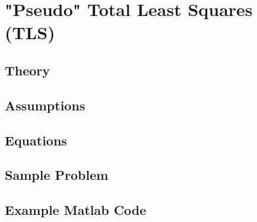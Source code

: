 \section{"Pseudo" Total Least Squares (TLS)}
\subsection{Theory}
\subsection{Assumptions}
\subsection{Equations}
\subsection{Sample Problem}
\subsection{Example Matlab Code}
